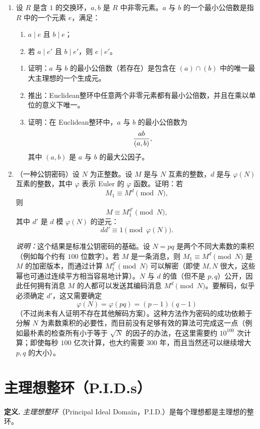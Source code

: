 \begin{enumerate}[label=\arabic*.]
	\item 设 $R$ 是含 $1$ 的交换环，$a,b$ 是 $R$ 中非零元素。$a$ 与 $b$ 的一个最小公倍数是指 $R$ 中的一个元素 $e$，满足：
	\begin{enumerate}[label=(\roman*)]
		\item $a\mid e$ 且 $b\mid e$；
		\item 若 $a\mid e'$ 且 $b\mid e'$，则 $e\mid e'$。
	\end{enumerate}
	\begin{enumerate}[label=(\alph*)]
		\item 证明：$a$ 与 $b$ 的最小公倍数（若存在）是包含在 $(a)\cap(b)$ 中的唯一最大主理想的一个生成元。
		\item 推出：Euclidean整环中任意两个非零元素都有最小公倍数，并且在乘以单位的意义下唯一。
		\item 证明：在 Euclidean整环中，$a$ 与 $b$ 的最小公倍数为
		\[
		{ab\over (a,b)},
		\]
		其中 $(a,b)$ 是 $a$ 与 $b$ 的最大公因子。
	\end{enumerate}
	
	\item （一种公钥密码）设 $N$ 为正整数。设 $M$ 是与 $N$ 互素的整数，$d$ 是与 $\varphi(N)$ 互素的整数，其中 $\varphi$ 表示 Euler 的 $\varphi$ 函数。证明：若
	\[
	M_1\equiv M^d\pmod N,
	\]
	则
	\[
	M\equiv M_1^{d'}\pmod N,
	\]
	其中 $d'$ 是 $d$ 模 $\varphi(N)$ 的逆元：
	\[
	dd'\equiv1\pmod{\varphi(N)}.
	\]
	
	\noindent\emph{说明：}这个结果是标准公钥密码的基础。设 $N=pq$ 是两个不同大素数的乘积（例如每个约有 $100$ 位数字）。若 $M$ 是一条消息，则 $M_1\equiv M^d\pmod N$ 是 $M$ 的加密版本，而通过计算 $M_1^{d'}\pmod N$ 可以解密（即使 $M,N$ 很大，这些幂也可通过连续平方相当容易地计算）。$N$ 与 $d$ 的值（但不是 $p,q$）公开，因此任何拥有消息 $M$ 的人都可以发送其编码消息 $M^d\pmod N$。要解码，似乎必须确定 $d'$，这又需要确定
	\[
	\varphi(N)=\varphi(pq)=(p-1)(q-1)
	\]
	（不过尚未有人证明不存在其他解码方案）。这种方法作为密码的成功依赖于分解 $N$ 为素数乘积的必要性，而目前没有足够有效的算法可完成这一点（例如最朴素的检查所有小于等于 $\sqrt N$ 的因子的办法，在这里需要约 $10^{100}$ 次计算；即使每秒 $100$ 亿次计算，也大约需要 $300$ 年，而且当然还可以继续增大 $p,q$ 的大小）。
\end{enumerate}


\section{主理想整环（P.I.D.s）}

\noindent\textbf{定义.}
\emph{主理想整环}（Principal Ideal Domain，P.I.D.）是每个理想都是主理想的整环。


